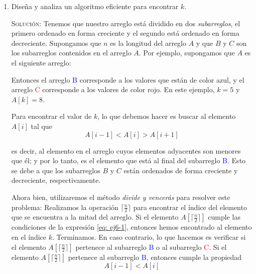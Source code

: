 \documentclass[letterpaper,11pt]{article}
\begin{document}
\begin{enumerate}
    \begin{enumerate}
		\item Diseña y analiza un algoritmo eficiente para encontrar $k$.
        
        \textsc{Solución:} Tenemos que nuestro arreglo está dividido en dos 
        \textit{subarreglos}, el primero ordenado en forma creciente y el 
        segundo está ordenado en forma decreciente. Supongamos que $n$ es la
        longitud del arreglo $A$ y que $B$ y $C$ son los subarreglos contenidos
        en el arreglo $A$. Por ejemplo, supongamos que $A$ es el siguiente 
        arreglo:
        \begin{center}
        \end{center}

        Entonces el arreglo \textcolor{blue}{B} corresponde a los valores que 
        están de color azul, y el arreglo \textcolor{red}{C} corresponde a los
        valores de color rojo. En este ejemplo, $k = 5$ y $A[k] = 8$.

        Para encontrar el valor de $k$, lo que debemos hacer es buscar al 
        elemento $A[i]$ tal que
        \begin{equation}
            \label{eq: ej6-1}
            A[i-1] < A[i] > A[i+1]
        \end{equation} 
        
        es decir, al elemento en el arreglo cuyos elementos adyacentes son 
        menores que él; y por lo tanto, es el elemento que está al final del 
        subarreglo \textcolor{blue}{B}. Esto se debe a que los subarreglos $B$ y 
        $C$ están ordenados de forma creciente y decreciente, respectivamente. 
        
        Ahora bien, utilizaremos el método \textit{divide y vencerás} para 
        resolver este problema: Realizamos la operación 
        $\lceil \frac{n}{2} \rceil$ para encontrar el índice del elemento que 
        se encuentra a la mitad del arreglo. Si el elemento 
        $A[\lceil \frac{n}{2} \rceil]$ cumple las condiciones de la expresión 
        \ref{eq: ej6-1}, entonces hemos encontrado al elemento en el índice $k$. 
        Terminamos. En caso contrario, lo que hacemos es verificar si el 
        elemento $A[\lceil \frac{n}{2} \rceil]$ pertenece al subarreglo 
        \textcolor{blue}{B} o al subarreglo \textcolor{red}{C}. Si el elemento 
        $A[\lceil \frac{n}{2} \rceil]$ pertenece al subarreglo 
        \textcolor{blue}{B}, entonces cumple la propiedad 
        \begin{equation}
            \label{eq: ej6-2}
            A[i-1] < A[i]  
        \end{equation}


\end{enumerate}
\end{enumerate}
\end{document}
